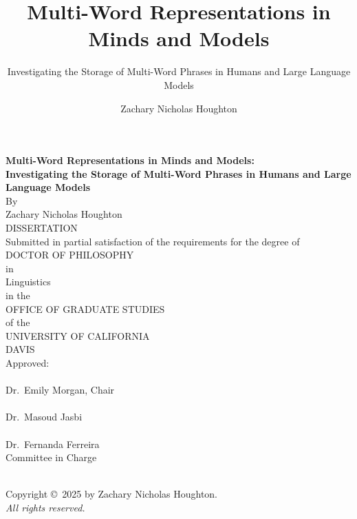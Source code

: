 \documentclass[
  12pt,
  letterpaper,
]{scrreprt}
\title{Multi-Word Representations in Minds and Models}
\subtitle{Investigating the Storage of Multi-Word Phrases in Humans and
Large Language Models}
\author{Zachary Nicholas Houghton}
\date{}
\begin{document}
\cleardoublepage
\thispagestyle{plain}
\begin{center}
   \null\vfill
   \textbf{%
      Multi-Word Representations in Minds and Models:\\
	  Investigating the Storage of Multi-Word Phrases in Humans and Large
  Language Models
   }%
   \\
   \bigskip
   By \\
   \bigskip
   {Zachary Nicholas Houghton}
\\   
   DISSERTATION \\
   \bigskip
   Submitted in partial satisfaction of the requirements for the
   degree of \\
   \bigskip
   DOCTOR OF PHILOSOPHY \\
   \bigskip
   in \\
   \bigskip
   {Linguistics} \\ 
      \bigskip
   in the \\
   \bigskip
   OFFICE OF GRADUATE STUDIES \\
   \bigskip        
   of the \\
   \bigskip
   UNIVERSITY OF CALIFORNIA \\
   \bigskip
   DAVIS \\
   \bigskip
   Approved: \\
   \bigskip
   \bigskip
   \makebox[3in]{\hrulefill} \\
   Dr.~Emily Morgan, Chair \\
   \bigskip
   \bigskip
   \makebox[3in]{\hrulefill} \\
   Dr.~Masoud Jasbi \\
   \bigskip
   \bigskip
   \makebox[3in]{\hrulefill} \\
   Dr.~Fernanda Ferreira \\
   \bigskip
   Committee in Charge \\
    \\
   \vfill
\end{center}


\newpage
{}
\setcounter{savedpage}{\value{page}}

\thispagestyle{empty}
\begin{titlepage}
\begin{center}
  Copyright \copyright\ 2025 by Zachary Nicholas Houghton. \\
  \textit{All rights reserved.}
\end{center}
\end{titlepage}
\end{document}
